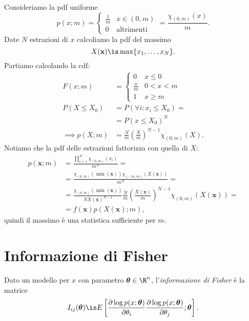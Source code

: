 
\begin{example}
	\label{th:unifmaxpdf}
	Consideriamo la pdf uniforme
	\begin{equation*}
		p(x;m) = \begin{cases}
			\frac1m & x\in(0,m) \\
			0 & \text{altrimenti}
		\end{cases}
		= \frac{\chi_{(0,m)}(x)}m.
	\end{equation*}
	Date $N$ estrazioni di $x$ calcoliamo la pdf del massimo
	\begin{equation*}
		X(\mathbf x) \is \max\{x_1,\dotsc,x_N\}.
	\end{equation*}
	Partiamo calcolando la cdf:
	\begin{align*}
		F(x;m) &= \begin{cases}
			0 & x \le 0 \\
			\frac xm & 0 < x < m \\
			1 & x \ge m
		\end{cases} \\
		P(X\le X_0)
		&= P(\forall i:x_i\le X_0) = \\
		&= P(x \le X_0)^N \\
		\implies
		p(X;m) &= \frac Nm \left( \frac Xm \right)^{N-1} \chi_{(0,m)}(X).
	\end{align*}
	Notiamo che la pdf delle estrazioni fattorizza con quella di $X$:
	\begin{align*}
		p(\mathbf x;m)
		&= \frac{\prod_{i=1}^N \chi_{(0,m)}(x_i)}{m^N} = \\
		&= \frac{\chi_{(0,\infty)}(\min(\mathbf x))\chi_{(-\infty,m)}(X(\mathbf x))}{m^N} = \\
		&= \frac{\chi_{(0,\infty)}(\min(\mathbf x))}{N X(\mathbf x)^{N-1}}
		\frac Nm \left( \frac{X(\mathbf x)}m \right)^{N-1} \chi_{(0,m)}(X(\mathbf x)) = \\
		&= f(\mathbf x) p(X(\mathbf x);m),
	\end{align*}
	quindi il massimo è una statistica sufficiente per $m$.
\end{example}

\section{Informazione di Fisher}

\begin{definition}
	Dato un modello per $x$ con parametro $\boldsymbol\theta\in\R^n$,
	l'\emph{informazione di Fisher} è la matrice
	\begin{equation*}
		I_{ij}(\boldsymbol\theta) \is E \left[
		\frac{\partial\log p(x;\boldsymbol\theta)}{\partial\theta_i}
		\frac{\partial\log p(x;\boldsymbol\theta)}{\partial\theta_j};\boldsymbol\theta \right].
	\end{equation*}
\end{definition}

